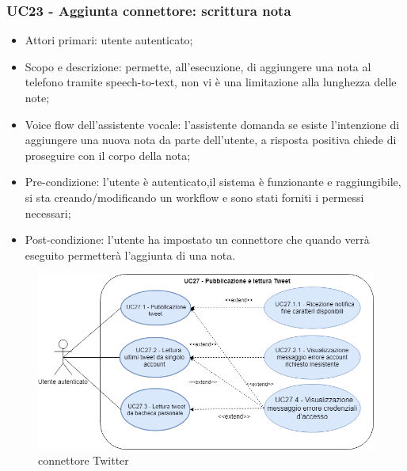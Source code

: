 \subsubsection{UC23 - Aggiunta connettore: scrittura nota}
\begin{itemize}
	\item  Attori primari: utente autenticato;
	\item  Scopo e descrizione: permette, all'esecuzione, di aggiungere una nota al telefono tramite speech-to-text, non vi è una limitazione alla lunghezza delle note;
	\item  Voice flow dell'assistente vocale: l'assistente domanda se esiste l'intenzione di aggiungere una nuova nota da parte dell'utente, a risposta positiva chiede di proseguire con il corpo della nota;
	\item  Pre-condizione: l'utente è autenticato,il sistema è funzionante e raggiungibile, si sta creando/modificando un workflow e sono stati forniti i permessi necessari;
	\item  Post-condizione: l'utente ha impostato un connettore che quando verrà eseguito permetterà l'aggiunta di una nota.
\end{itemize}

\begin{figure}[H]
	\centering
	\includegraphics[width=14cm,keepaspectratio]{../includes/pics/connettore_twitter.png}
	\caption{\label{fig:mission}connettore Twitter}
\end{figure}

